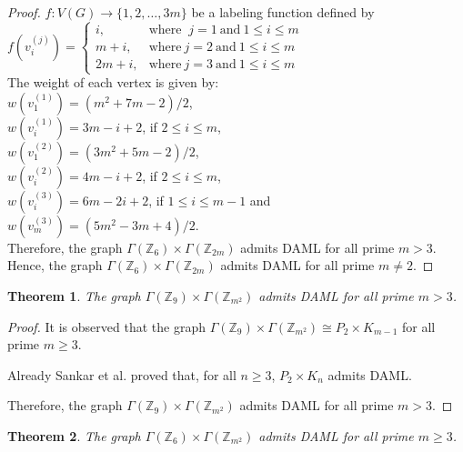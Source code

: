 \documentclass[12pt]{article}
\newtheorem{theorem}{Theorem}[section]
\newcommand{\mZ}{{\mathbb Z}}
\begin{document}
\begin{proof}
$f : V(G) \to \{1, 2, \dots, 3m\}$ be a labeling function defined by\\
$f(v_i^{(j)}) = \begin{cases} i, & \text{where }  \ j = 1  \ \text{and}\ 1 \leq i \leq m\\ 
                            m+i, & \text{where}  \  j = 2 \ \text{and} \ 1 \leq i \leq m\\    
                            2m+i, & \text{where} \ j = 3 \ \text{and}\ 1 \leq i \leq m \end{cases}$\\
The weight of each vertex is given by:\\
$w(v_1^{(1)}) = (m^2+7m-2)/2$,\\
$w(v_i^{(1)}) = 3m-i+2$, if $2 \leq i \leq m$,\\
$w(v_1^{(2)}) = (3m^2+5m-2)/2$,\\
$w(v_i^{(2)}) = 4m-i+2$, if $2 \leq i \leq m$,\\
$w(v_i^{(3)}) = 6m-2i+2$, if $1 \leq i \leq m-1$ and\\
$w(v_m^{(3)}) = (5m^2-3m+4)/2$.\\
Therefore, the graph $\Gamma(\mZ_6) \times \Gamma(\mZ_{2m})$ admits DAML for
all prime $m > 3$.\\
Hence, the graph $\Gamma(\mZ_6) \times \Gamma(\mZ_{2m})$ admits DAML for
all prime $m \neq 2$.
\end{proof}

\begin{theorem}
The graph $\Gamma(\mZ_9) \times \Gamma(\mZ_{m^2})$ admits DAML for all
prime $m > 3$.
\end{theorem}

\begin{proof}
It is observed that the graph $\Gamma(\mZ_9) \times \Gamma(\mZ_{m^2})
\cong P_2 \times K_{m-1}$ for all prime $m \geq 3$.

Already Sankar et al. \cite{ss} proved that, for all $n \geq 3$, $P_2 \times K_n$ admits DAML.

Therefore, the graph $\Gamma(\mZ_9) \times \Gamma(\mZ_{m^2})$ admits DAML
for all prime $m > 3$.
\end{proof}

\begin{theorem}
The graph $\Gamma(\mZ_6) \times \Gamma(\mZ_{m^2})$ admits DAML for all
prime $m \geq 3$.
\end{theorem}
\end{document}

